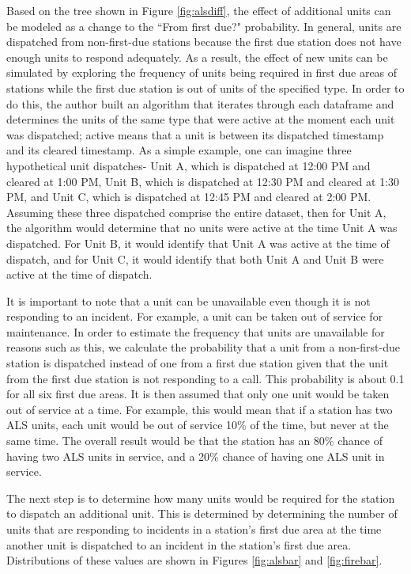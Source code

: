 \documentclass[article]{proc}
\begin{document}
Based on the tree shown in Figure \ref{fig:alsdiff}, the effect of additional units can be modeled as a change to the ``From first due?" probability. In general, units are dispatched from non-first-due stations because the first due station does not have enough units to respond adequately. As a result, the effect of new units can be simulated by exploring the frequency of units being required in first due areas of stations while the first due station is out of units of the specified type. In order to do this, the author built an algorithm that iterates through each dataframe and determines the units of the same type that were active at the moment each unit was dispatched; active means that a unit is between its dispatched timestamp and its cleared timestamp.
As a simple example, one can imagine three hypothetical unit dispatches- Unit A, which is dispatched at 12:00 PM and cleared at 1:00 PM, Unit B, which is dispatched at 12:30 PM and cleared at 1:30 PM, and Unit C, which is dispatched at 12:45 PM and cleared at 2:00 PM. Assuming these three dispatched comprise the entire dataset, then for Unit A, the algorithm would determine that no units were active at the time Unit A was dispatched. For Unit B, it would identify that Unit A was active at the time of dispatch, and for Unit C, it would identify that both Unit A and Unit B were active at the time of dispatch. 

It is important to note that a unit can be unavailable even though it is not responding to an incident. For example, a unit can be taken out of service for maintenance. In order to estimate the frequency that units are unavailable for reasons such as this, we calculate the probability that a unit from a non-first-due station is dispatched instead of one from a first due station given that the unit from the first due station is not responding to a call. This probability is about 0.1 for all six first due areas. It is then assumed that only one unit would be taken out of service at a time. For example, this would mean that if a station has two ALS units, each unit would be out of service 10\% of the time, but never at the same time. The overall result would be that the station has an 80\% chance of having two ALS units in service, and a 20\% chance of having one ALS unit in service.

The next step is to determine how many units would be required for the station to dispatch an additional unit. This is determined by determining the number of units that are responding to incidents in a station's first due area at the time another unit is dispatched to an incident in the station's first due area. Distributions of these values are shown in Figures \ref{fig:alsbar} and \ref{fig:firebar}.
\end{document}
